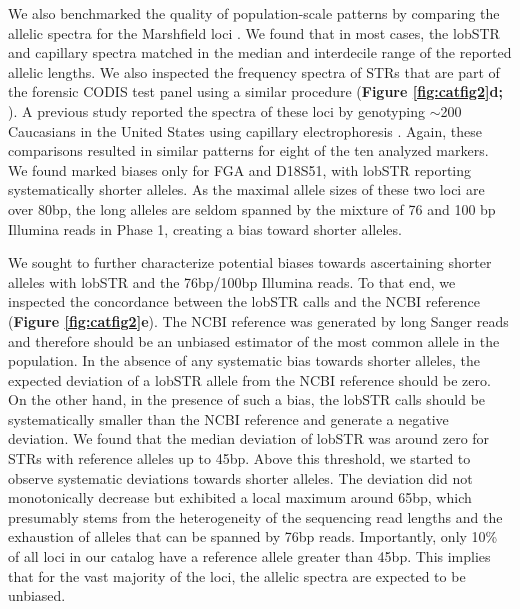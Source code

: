 We also benchmarked the quality of population-scale patterns by comparing the allelic spectra for the Marshfield loci \cite{SuppWillemsGymrekHighnamEtAl2014}. We found that in most cases, the lobSTR and capillary spectra matched in the median and interdecile range of the reported allelic lengths. We also inspected the frequency spectra of STRs that are part of the forensic CODIS test panel using a similar procedure (\textbf{Figure \ref{fig:catfig2}d; \cite{SuppWillemsGymrekHighnamEtAl2014}}). A previous study reported the spectra of these loci by genotyping $\sim$200 Caucasians in the United States using capillary electrophoresis \cite{BudowleSheaNiezgodaEtAl2001}. Again, these comparisons resulted in similar patterns for eight of the ten analyzed markers. We found marked biases only for FGA and D18S51, with lobSTR reporting systematically shorter alleles. As the maximal allele sizes of these two loci are over 80bp, the long alleles are seldom spanned by the mixture of 76 and 100 bp Illumina reads in Phase 1, creating a bias toward shorter alleles.  

We sought to further characterize potential biases towards ascertaining shorter alleles with lobSTR and the 76bp/100bp Illumina reads. To that end, we inspected the concordance between the lobSTR calls and the NCBI reference (\textbf{Figure \ref{fig:catfig2}e}). The NCBI reference was generated by long Sanger reads and therefore should be an unbiased estimator of the most common allele in the population. In the absence of any systematic bias towards shorter alleles, the expected deviation of a lobSTR allele from the NCBI reference should be zero. On the other hand, in the presence of such a bias, the lobSTR calls should be systematically smaller than the NCBI reference and generate a negative deviation. We found that the median deviation of lobSTR was around zero for STRs with reference alleles up to 45bp. Above this threshold, we started to observe systematic deviations towards shorter alleles. The deviation did not monotonically decrease but exhibited a local maximum around 65bp, which presumably stems from the heterogeneity of the sequencing read lengths and the exhaustion of alleles that can be spanned by 76bp reads. Importantly, only 10\% of all loci in our catalog have a reference allele greater than 45bp. This implies that for the vast majority of the loci, the allelic spectra are expected to be unbiased.  

